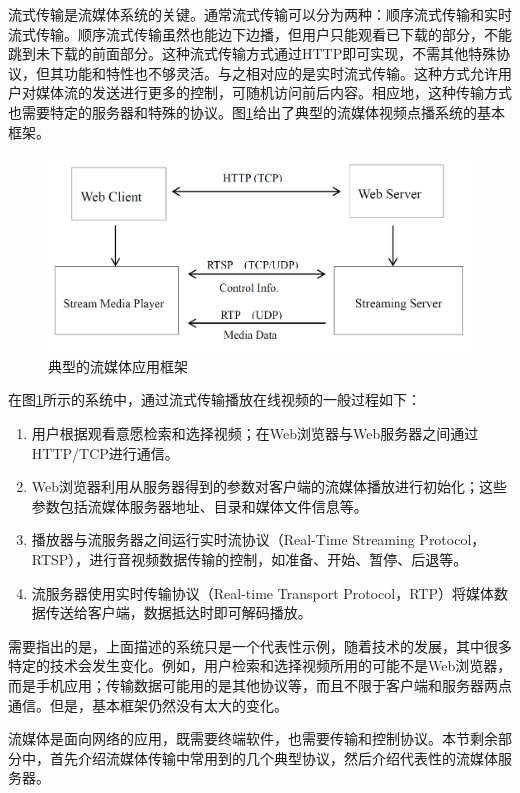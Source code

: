 流式传输是流媒体系统的关键。通常流式传输可以分为两种：顺序流式传输和实时流式传输。顺序流式传输虽然也能边下边播，但用户只能观看已下载的部分，不能跳到未下载的前面部分。这种流式传输方式通过HTTP即可实现，不需其他特殊协议，但其功能和特性也不够灵活。与之相对应的是实时流式传输。这种方式允许用户对媒体流的发送进行更多的控制，可随机访问前后内容。相应地，这种传输方式也需要特定的服务器和特殊的协议。图\ref{fig:10}给出了典型的流媒体视频点播系统的基本框架。

\begin{figure}[h]
	\centering
	\includegraphics[width = 1.0\linewidth]{clip/10.png}
	\caption{典型的流媒体应用框架\label{fig:10}}
\end{figure}

在图\ref{fig:10}所示的系统中，通过流式传输播放在线视频的一般过程如下：
\begin{enumerate}
\item 用户根据观看意愿检索和选择视频；在Web浏览器与Web服务器之间通过HTTP/TCP进行通信。
\item Web浏览器利用从服务器得到的参数对客户端的流媒体播放进行初始化；这些参数包括流媒体服务器地址、目录和媒体文件信息等。
\item 播放器与流服务器之间运行实时流协议（Real-Time Streaming Protocol，RTSP），进行音视频数据传输的控制，如准备、开始、暂停、后退等。
\item 流服务器使用实时传输协议（Real-time Transport Protocol，RTP）将媒体数据传送给客户端，数据抵达时即可解码播放。
\end{enumerate}

需要指出的是，上面描述的系统只是一个代表性示例，随着技术的发展，其中很多特定的技术会发生变化。例如，用户检索和选择视频所用的可能不是Web浏览器，而是手机应用；传输数据可能用的是其他协议等，而且不限于客户端和服务器两点通信。但是，基本框架仍然没有太大的变化。

流媒体是面向网络的应用，既需要终端软件，也需要传输和控制协议。本节剩余部分中，首先介绍流媒体传输中常用到的几个典型协议，然后介绍代表性的流媒体服务器。

